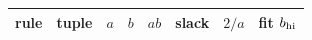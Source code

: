 \begin{tabular}{rlrrrrrr}
\hline
rule & tuple & $a$ & $b$ & $ab$ & slack & $2/a$ & fit $b_{\rm hi}$ \\
\hline

\hline
\end{tabular}
